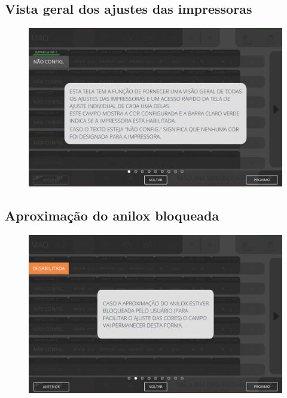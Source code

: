 \thispagestyle{fancy}
\vspace*{40 pt}
\subsection{Vista geral dos ajustes das impressoras}
\vspace*{\fill}
\begin{figure}[h]
    \centering
    \includegraphics[width=480 px,height=300 px]{src/imagesICV/04-printters/01-printters/settings/1.png}
\end{figure}
\vspace*{\fill}

\newpage
\thispagestyle{fancy}
\vspace*{40 pt}
\subsection{Aproximação do anilox bloqueada}
\vspace*{\fill}
\begin{figure}[h]
    \centering
    \includegraphics[width=576 px,height=360 px]{src/imagesICV/04-printters/01-printters/settings/2.png}
\end{figure}
\vspace*{\fill}

